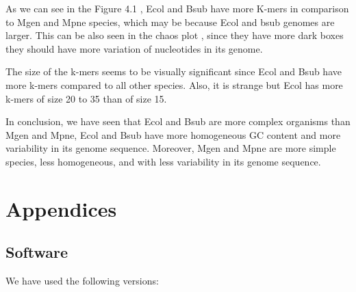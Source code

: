 \documentclass[10pt,a4paper,]{article}
\newenvironment{Shaded}{}{}
\newcommand{\CommentTok}[1]{\textcolor[rgb]{0.38,0.63,0.69}{\textit{#1}}}
\newcommand{\ExtensionTok}[1]{#1}
\newcommand{\FunctionTok}[1]{\textcolor[rgb]{0.02,0.16,0.49}{#1}}
\newcommand{\NormalTok}[1]{#1}
\begin{document}
As we can see in the Figure 4.1 \pageref{fig:rplots}, Ecol and Bsub have
more K-mers in comparison to Mgen and Mpne species, which may be because
Ecol and bsub genomes are larger. This can be also seen in the chaos
plot \pageref{fig:chaosplot}, since they have more dark boxes they
should have more variation of nucleotides in its genome.

The size of the k-mers seems to be visually significant since Ecol and
Bsub have more k-mers compared to all other species. Also, it is strange
but Ecol has more k-mers of size 20 to 35 than of size 15.

In conclusion, we have seen that Ecol and Bsub are more complex
organisms than Mgen and Mpne, Ecol and Bsub have more homogeneous GC
content and more variability in its genome sequence. Moreover, Mgen and
Mpne are more simple species, less homogeneous, and with less
variability in its genome sequence.

\clearpage

\hypertarget{appendices}{%
\section{Appendices}\label{appendices}}

\label{sec:appendices}

\hypertarget{software}{%
\subsection{Software}\label{software}}

We have used the following versions:

\begin{Shaded}
\end{Shaded}
\end{document}
